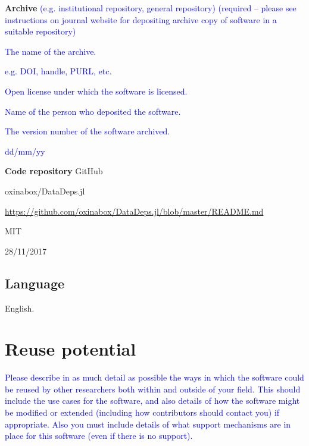 \documentclass{jors}
\begin{document}
{\bf Archive} \textcolor{blue}{(e.g. institutional repository, general repository) (required – please see instructions on journal website for depositing archive copy of software in a suitable repository)} 

\begin{description}[noitemsep,topsep=0pt]
	\item[Name:] \textcolor{blue}{The name of the archive.}
	\item[Persistent identifier:] \textcolor{blue}{e.g. DOI, handle, PURL, etc.}
	\item[Licence:] \textcolor{blue}{Open license under which the software is licensed.}
	\item[Publisher:]  \textcolor{blue}{Name of the person who deposited the software.}
	\item[Version published:] \textcolor{blue}{The version number of the software archived.}
	\item[Date published:] \textcolor{blue}{dd/mm/yy}
\end{description}



{\bf Code repository} GitHub

\begin{description}[noitemsep,topsep=0pt]
	\item[Name:] oxinabox/DataDeps.jl
	\item[Persistent identifier:] \url{https://github.com/oxinabox/DataDeps.jl/blob/master/README.md}
	\item[Licence:] MIT
	\item[Date published:] 28/11/2017
\end{description}


\subsection{Language}
English.

\section{Reuse potential}
\textcolor{blue}{Please describe in as much detail as possible the ways in which the software could be reused by other researchers both within and outside of your field. This should include the use cases for the software, and also details of how the software might be modified or extended (including how contributors should contact you) if appropriate. Also you must include details of what support mechanisms are in place for this software (even if there is no support).}
\end{document}
